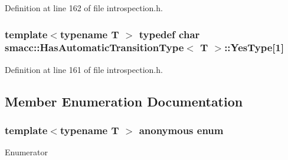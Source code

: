 Definition at line 162 of file introspection.\+h.

\subsubsection[{\texorpdfstring{Yes\+Type}{YesType}}]{\setlength{\rightskip}{0pt plus 5cm}template$<$typename T $>$ typedef char {\bf smacc\+::\+Has\+Automatic\+Transition\+Type}$<$ T $>$\+::Yes\+Type\mbox{[}1\mbox{]}\hspace{0.3cm}{\ttfamily [private]}}\hypertarget{classsmacc_1_1HasAutomaticTransitionType_a0261cbc759cb52b6f60495d327a088a4}{}\label{classsmacc_1_1HasAutomaticTransitionType_a0261cbc759cb52b6f60495d327a088a4}


Definition at line 161 of file introspection.\+h.



\subsection{Member Enumeration Documentation}
\subsubsection[{\texorpdfstring{anonymous enum}{anonymous enum}}]{\setlength{\rightskip}{0pt plus 5cm}template$<$typename T $>$ anonymous enum}\hypertarget{classsmacc_1_1HasAutomaticTransitionType_af7c2dd6009f2a3464a9b253b5eabe8e5}{}\label{classsmacc_1_1HasAutomaticTransitionType_af7c2dd6009f2a3464a9b253b5eabe8e5}
\begin{Desc}
\item[Enumerator]\par
\begin{description}
\item[{\em 
value\hypertarget{classsmacc_1_1HasAutomaticTransitionType_af7c2dd6009f2a3464a9b253b5eabe8e5ac3dba7514caf15e85491ccfd880b108b}{}\label{classsmacc_1_1HasAutomaticTransitionType_af7c2dd6009f2a3464a9b253b5eabe8e5ac3dba7514caf15e85491ccfd880b108b}
}]\end{description}
\end{Desc}


